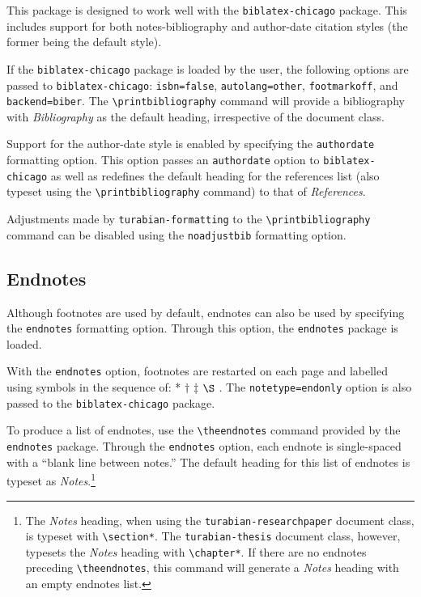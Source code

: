 \documentclass{article}
\newcommand{\textcmd}[1]{\texttt{\textbackslash #1}}
\begin{document}
This package is designed to work well with the \texttt{biblatex-chicago} package. This includes support for both notes-bibliography and author-date citation styles (the former being the default style).

If the \texttt{biblatex-chicago} package is loaded by the user, the following options are passed to \texttt{biblatex-chicago}: \texttt{isbn=false}, \texttt{autolang=other}, \texttt{footmarkoff}, and \texttt{backend=biber}. The \textcmd{printbibliography} command will provide a bibliography with \emph{Bibliography} as the default heading, irrespective of the document class.

%
Support for the author-date style is enabled by specifying the \texttt{authordate} formatting option. This option passes an \texttt{authordate} option to \texttt{biblatex-chicago} as well as redefines the default heading for the references list (also typeset using the \textcmd{printbibliography} command) to that of \emph{References}.

%
Adjustments made by \texttt{turabian-formatting} to the \textcmd{printbibliography} command can be disabled using the \texttt{noadjustbib} formatting option.

\subsection{Endnotes}

%
Although footnotes are used by default, endnotes can also be used by specifying the \texttt{endnotes} formatting option. Through this option, the \texttt{endnotes} package is loaded.

With the \texttt{endnotes} option, footnotes are restarted on each page and labelled using symbols in the sequence of: * $\dagger$ $\ddagger$ $\S$ .\autocite[161]{turabian_manual_2018} The \texttt{notetype=endonly} option is also passed to the \texttt{biblatex-chicago} package.

To produce a list of endnotes, use the \textcmd{theendnotes} command provided by the \texttt{endnotes} package. Through the \texttt{endnotes} option, each endnote is single-spaced with a ``blank line between notes.'' The default heading for this list of endnotes is typeset as \emph{Notes}.\footnote{%
	The \emph{Notes} heading, when using the \texttt{turabian-researchpaper} document class, is typeset with \textcmd{section*}. The \texttt{turabian-thesis} document class, however, typesets the \emph{Notes} heading with \textcmd{chapter*}. If there are no endnotes preceding \textcmd{theendnotes}, this command will generate a \emph{Notes} heading with an empty endnotes list.}
\end{document}
